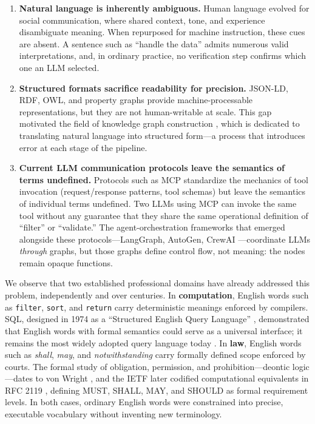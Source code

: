 \documentclass{article}
\begin{document}
\begin{enumerate}
    \item \textbf{Natural language is inherently ambiguous.} Human language evolved for social communication, where shared context, tone, and experience disambiguate meaning. When repurposed for machine instruction, these cues are absent. A sentence such as ``handle the data'' admits numerous valid interpretations, and, in ordinary practice, no verification step confirms which one an LLM selected.

    \item \textbf{Structured formats sacrifice readability for precision.} JSON-LD, RDF, OWL, and property graphs provide machine-processable representations, but they are not human-writable at scale. This gap motivated the field of knowledge graph construction \citep{bian2025llm}, which is dedicated to translating natural language into structured form---a process that introduces error at each stage of the pipeline.

    \item \textbf{Current LLM communication protocols leave the semantics of terms undefined.} Protocols such as MCP \citep{mcp2025} standardize the mechanics of tool invocation (request/response patterns, tool schemas) but leave the semantics of individual terms undefined. Two LLMs using MCP can invoke the same tool without any guarantee that they share the same operational definition of ``filter'' or ``validate.'' The agent-orchestration frameworks that emerged alongside these protocols---LangGraph, AutoGen, CrewAI \citep{langgraph2024, wu2023autogen, crewai2023}---coordinate LLMs \emph{through} graphs, but those graphs define control flow, not meaning: the nodes remain opaque functions.
\end{enumerate}

We observe that two established professional domains have already addressed this problem, independently and over centuries. In \textbf{computation}, English words such as \texttt{filter}, \texttt{sort}, and \texttt{return} carry deterministic meanings enforced by compilers. SQL, designed in 1974 as a ``Structured English Query Language'' \citep{chamberlin1974sequel}, demonstrated that English words with formal semantics could serve as a universal interface; it remains the most widely adopted query language today \citep{chamberlin2012early}. In \textbf{law}, English words such as \textit{shall}, \textit{may}, and \textit{notwithstanding} carry formally defined scope enforced by courts. The formal study of obligation, permission, and prohibition---deontic logic---dates to von Wright \citep{vonwright1951deontic}, and the IETF later codified computational equivalents in RFC 2119 \citep{rfc2119}, defining MUST, SHALL, MAY, and SHOULD as formal requirement levels. In both cases, ordinary English words were constrained into precise, executable vocabulary without inventing new terminology.
\end{document}
